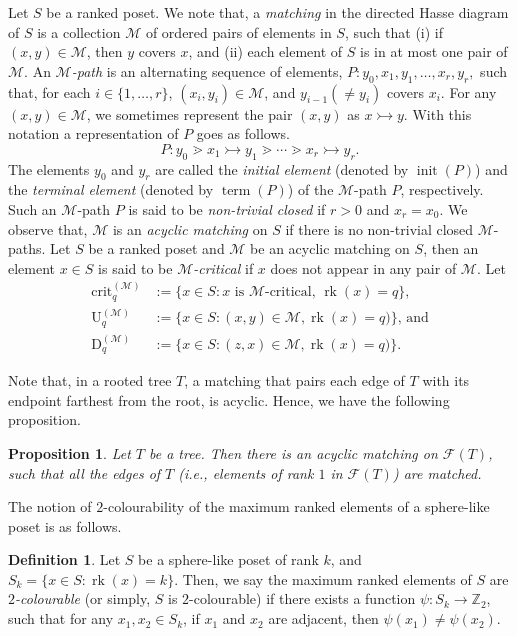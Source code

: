 \documentclass[12pt]{article}
\newtheorem{proposition}[theorem]{Proposition}
\theoremstyle{definition}
\newtheorem{definition}[theorem]{Definition}
\theoremstyle{remark}
\newcommand{\rk}{\operatorname{rk}}
\newcommand{\crit}{\operatorname{crit}}
\newcommand{\up}{\operatorname{U}}
\newcommand{\dn}{\operatorname{D}}
\newcommand{\M}{\mathcal{M}}
\begin{document}
	Let $S$ be a ranked poset. We note that, a \emph{matching} in the directed Hasse diagram of $S$   is a collection $\M$ 
	of ordered pairs of elements in $S$, such that (i) if $(x,y)\in \M$, then $y$ covers $x$, and (ii) each element of $S$ is in at most one pair of $\M$.
	An \emph{$\M$-path} is an alternating sequence of elements,
	$P:y_0,x_1, y_1, \ldots, x_r,
	y_r,$
	such that, for each $i \in \{1,\ldots,r\}$, $(x_i,y_i) \in
	\M$, and $y_{i-1} (\neq y_i)$ covers $x_i$. For any $(x,y)\in \M$, we sometimes represent the pair $(x,y)$ as $x \rightarrowtail y$. With this notation a representation of $P$ goes as follows.
	\[P:y_0\gtrdot x_1 \rightarrowtail y_1 \gtrdot \cdots \gtrdot  x_r \rightarrowtail
	y_r.\]
	The elements $y_0$ and $y_r$ are called the \emph{initial element} (denoted by $\operatorname{init}(P)$) and the \emph{terminal element} (denoted by $\operatorname{term}(P)$) of the $\M$-path $P$, respectively. Such an $\M$-path $P$ is said to be \emph{non-trivial closed} if
	$r > 0$ and $x_{r} = x_0$. We observe that, $\M$ is an \emph{acyclic matching} on $S$ if there is no non-trivial closed $\M$-paths.
	Let $S$ be a ranked poset and $\M$ be an acyclic matching on $S$, then  an element $x\in S$ is said to be \emph{$\M$-critical} if  $x$ does not appear in any pair of $\M$. Let
	\begin{align*}
		\crit_q^{(\M)} &:=\{x\in S: x \text{ is $\M$-critical, } \rk(x)=q\},\\
		\up_q^{(\M)} &:=\{x\in S: (x,y)\in \M, \rk(x)=q)\}\text{, and}\\
		\dn_q^{(\M)} &:=\{x\in S: (z,x)\in \M, \rk(x)=q)\}.
	\end{align*} 
	
	 Note that, in a rooted tree $T$, a matching that pairs each edge of $T$  with its endpoint farthest from the root, is acyclic. Hence, we have the following proposition.
	\begin{proposition}\label{tree}
	    Let $T$ be a tree. Then there is an acyclic matching on $\mathcal{F}(T)$, such that all the edges of $T$ (i.e., elements of rank $1$ in $\mathcal{F}(T)$) are matched. 
	\end{proposition}

	 The notion of $2$-colourability of the maximum ranked elements of a sphere-like poset
	 is as follows.
	 \begin{definition}
	 	Let $S$ be a sphere-like poset of rank $k$, and $S_k=\{x\in S: \rk(x)=k\}$. Then, we say the maximum ranked elements of $S$ are \emph{$2$-colourable} (or simply, $S$ is $2$-colourable) if there exists a function $\psi: S_k\rightarrow \mathbb{Z}_2$, such that for any $x_1,x_2 \in S_k$, if $x_1$ and $x_2$ are adjacent, then $\psi(x_1)\neq \psi(x_2)$.
	 \end{definition}
	 
\end{document}
